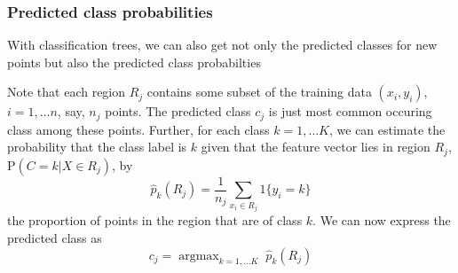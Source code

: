 \documentclass[mathserif]{beamer}
\newcommand{\argmax}{\mathop{\mathrm{argmax}}}
\def\P{\mathrm{P}}
\def\red{\color[rgb]{0.8,0,0}}
\begin{document}
\begin{frame}
\frametitle{Predicted class probabilities}
\smallskip
\smallskip
With classification trees, we can also get not only the predicted
classes for new points but also the {\red predicted class probabilties}

\bigskip
Note that each region $R_j$ contains some subset of the training data
$(x_i,y_i)$, $i=1,\ldots n$, say, $n_j$ points. The predicted class $c_j$ is 
just most common occuring class among these points. Further, for each class
$k=1,\ldots K$, we can estimate the probability that the class label is $k$
given that the feature vector lies in region $R_j$, $\P(C=k|X\in R_j)$, by
$$\hat{p}_k (R_j) = \frac{1}{n_j}\sum_{x_i \in R_j} 1\{y_i = k\}$$
the {\red proportion of points} in the region that are of class $k$. 
We can now express the predicted class as
$$c_j = \argmax_{k=1,\ldots K} \; \hat{p}_k (R_j)$$
\end{frame}
\end{document}

